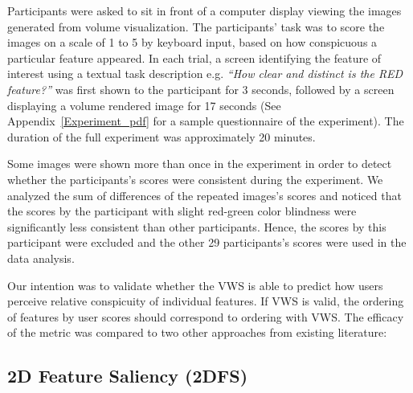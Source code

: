 Participants were asked to sit in front of a computer display viewing the images generated from volume visualization. The participants' task was to score the images on a scale of 1 to 5 by keyboard input, based on how conspicuous a particular feature appeared. In each trial, a screen identifying the feature of interest using a textual task description e.g. \textit{``How clear and distinct is the RED feature?''} was first shown to the participant for 3 seconds, followed by a screen displaying a volume rendered image for 17 seconds (See Appendix~\ref{Experiment_pdf} for a sample questionnaire of the experiment). The duration of the full experiment was approximately 20 minutes.

Some images were shown more than once in the experiment in order to detect whether the participants's scores were consistent during the experiment. We analyzed the sum of differences of the repeated images's scores and noticed that the scores by the participant with slight red-green color blindness were significantly less consistent than other participants.
Hence, the scores by this participant were excluded and the other 29 participants's scores were used in the data analysis.

Our intention was to validate whether the VWS is able to predict how users perceive relative conspicuity of individual features. If VWS is valid, the ordering of features by user scores should correspond to ordering with VWS. The efficacy of the metric was compared to two other approaches from existing literature:

\subsection{2D Feature Saliency (2DFS) \label{2d_feature_saliency}}

